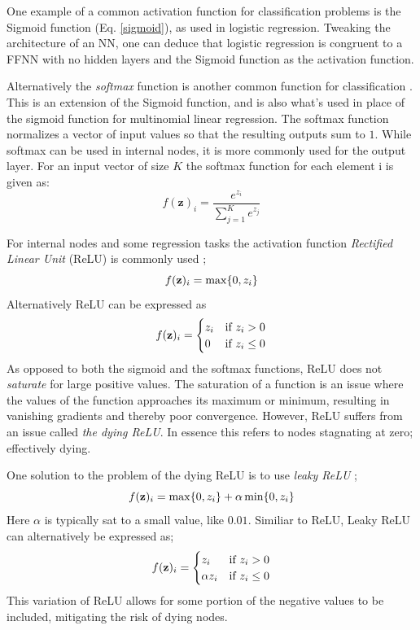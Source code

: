 One example of a common activation function for classification problems is the Sigmoid function (Eq. \ref{sigmoid}), as used in logistic regression. Tweaking the architecture of an NN, one can deduce that logistic regression is congruent to a FFNN with no hidden layers and the Sigmoid function as the activation function. 

Alternatively the \textit{softmax} function is another common function for classification \citep[Logistic Regression]{morten}. 
This is an extension of the Sigmoid function, and is also what's used in place of the sigmoid function for multinomial linear regression.
The softmax function normalizes a vector of input values so that the resulting outputs sum to $1$. While softmax can be used in internal nodes, it is more commonly used for the output layer. For an input vector of size $K$ the softmax function for each element i is given as: 
\begin{equation}\label{softmax}
f(\mathbf{z})_i = \frac{e^{z_i}}{\sum_{j=1}^K e^{z_j}}
\end{equation}


For internal nodes and some regression tasks the activation function \textit{Rectified Linear Unit} (ReLU) is commonly used \citep[Building a feed forward neural network]{morten}; 
\begin{equation}\label{relu}
    f(\bold{z})_i=\max\{0, z_i\}
\end{equation}
Alternatively ReLU can be expressed as
\begin{equation}
    f(\bold{z})_i = \begin{cases} 
      z_i & \text{if } z_i > 0 \\
      0 & \text{if } z_i \leq 0 
   \end{cases}    
\end{equation}
As opposed to both the sigmoid and the softmax functions, ReLU does not \textit{saturate} for large positive values. The saturation of a function is an issue where the values of the function approaches its maximum or minimum, resulting in vanishing gradients and thereby poor convergence. However, ReLU suffers from an issue called \textit{the dying ReLU}. In essence this refers to nodes stagnating at zero; effectively dying. 

One solution to the problem of the dying ReLU is to use \textit{leaky ReLU} \citep[p. 190]{Goodfellow-et-al-2016}; 
\begin{equation}
    f(\bold{z})_i=\max\{0, z_i\}+\alpha\min\{0,z_i\}
\end{equation}
Here $\alpha$ is typically sat to a small value, like $0.01$. 
Similiar to ReLU, Leaky ReLU can alternatively be expressed as; 
\begin{equation}
    f(\bold{z})_i = \begin{cases} 
      z_i & \text{if } z_i > 0 \\
      \alpha z_i & \text{if } z_i \leq 0 
   \end{cases}
\end{equation}
This variation of ReLU allows for some portion of the negative values to be included, mitigating the risk of dying nodes. 

